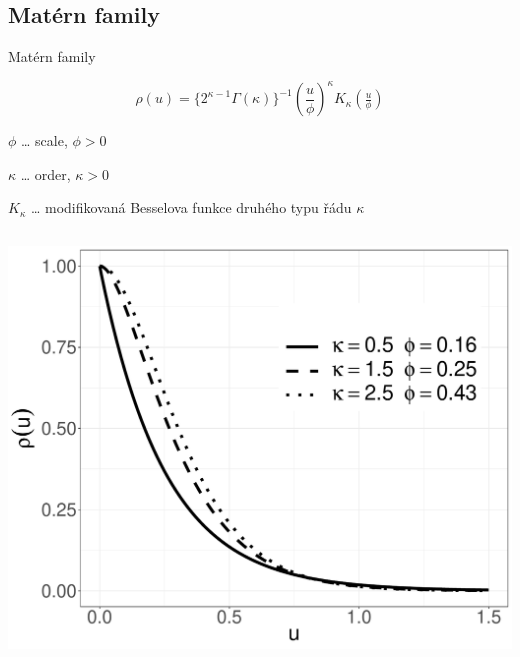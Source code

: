 \documentclass[
  ignorenonframetext,
]{beamer}
\begin{document}
\hypertarget{matuxe9rn-family}{%
\subsection{Matérn family}\label{matuxe9rn-family}}

\begin{frame}{Matérn family}
\large

\[\rho(u)=\{2^{\kappa-1}\Gamma(\kappa)\}^{-1}\left(\frac{u}{\phi}\right)^\kappa K_\kappa\left(\tfrac{u}{\phi}\right)\]

\small

\(\phi\) \ldots{} scale, \(\phi>0\)

\(\kappa\) \ldots{} order, \(\kappa>0\)

\(K_\kappa\) \ldots{} modifikovaná Besselova funkce druhého typu řádu
\(\kappa\)

\begin{columns}[T]
\begin{column}{0.5\textwidth}
\includegraphics{Lecture_1_files/figure-beamer/unnamed-chunk-24-1.pdf}
\end{column}


\end{columns}
\end{frame}
\end{document}

